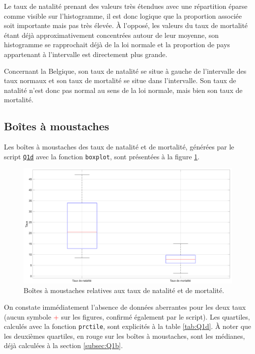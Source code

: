 \documentclass[a4paper, 12pt]{article}
\begin{document}
	Le taux de natalité prenant des valeurs très étendues avec une répartition éparse comme visible sur l'histogramme, il est donc logique que la proportion associée soit importante mais pas très élevée. À l'opposé, les valeurs du taux de mortalité étant déjà approximativement concentrées autour de leur moyenne, son histogramme se rapprochait déjà de la loi normale et la proportion de pays appartenant à l'intervalle est directement plus grande.\par
	
	Concernant la Belgique, son taux de natalité se situe à gauche de l'intervalle des taux normaux et son taux de mortalité se situe dans l'intervalle. Son taux de natalité n'est donc pas normal au sens de la loi normale, mais bien son taux de mortalité. 
	
	\subsection{Boîtes à moustaches}
	Les boîtes à moustaches des taux de natalité et de mortalité, générées par le script \hyperref[subsec:code-Q1]{\texttt{Q1d}} avec la fonction \texttt{boxplot}, sont présentées à la figure \ref{fig:Q1d}.\par
	
	\begin{figure}[!ht]
	    \centering
	    \includegraphics[width=\textwidth]{resources/pdf/figures/Q1d.pdf}
	    \caption{Boîtes à moustaches relatives aux taux de natalité et de mortalité.}
	    \label{fig:Q1d}
	\end{figure}
	
	On constate immédiatement l'absence de données aberrantes pour les deux taux (aucun symbole \og \textcolor{red}{+}\fg{} sur les figures, confirmé également par le script). Les quartiles, calculés avec la fonction \texttt{prctile}, sont explicités à la table \ref{tab:Q1d}. À noter que les deuxièmes quartiles, en rouge sur les boîtes à moustaches, sont les médianes, déjà calculées à la section \ref{subsec:Q1b}.\par
	
\end{document}
